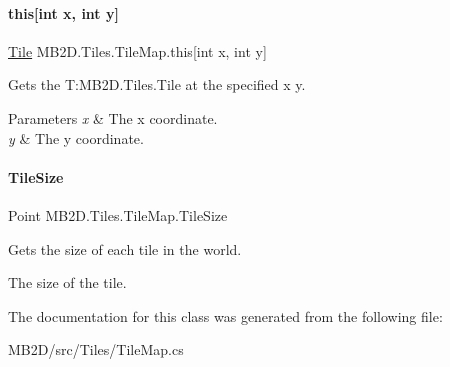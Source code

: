 \paragraph{\texorpdfstring{this[int x, int y]}{this[int x, int y]}}
{\footnotesize\ttfamily \hyperlink{class_m_b2_d_1_1_tile}{Tile} M\+B2\+D.\+Tiles.\+Tile\+Map.\+this\mbox{[}int x, int y\mbox{]}\hspace{0.3cm}{\ttfamily [get]}}



Gets the T\+:\+M\+B2\+D.\+Tiles.\+Tile at the specified x y. 


\begin{DoxyParams}{Parameters}
{\em x} & The x coordinate.\\
\hline
{\em y} & The y coordinate.\\
\hline
\end{DoxyParams}
\hypertarget{class_m_b2_d_1_1_tiles_1_1_tile_map_a8bdd9b00d7aaba26f9078d3f32438169}{}\label{class_m_b2_d_1_1_tiles_1_1_tile_map_a8bdd9b00d7aaba26f9078d3f32438169} 
\paragraph{\texorpdfstring{Tile\+Size}{TileSize}}
{\footnotesize\ttfamily Point M\+B2\+D.\+Tiles.\+Tile\+Map.\+Tile\+Size\hspace{0.3cm}{\ttfamily [get]}}



Gets the size of each tile in the world. 

The size of the tile.

The documentation for this class was generated from the following file\+:\begin{DoxyCompactItemize}
\item 
M\+B2\+D/src/\+Tiles/Tile\+Map.\+cs\end{DoxyCompactItemize}

